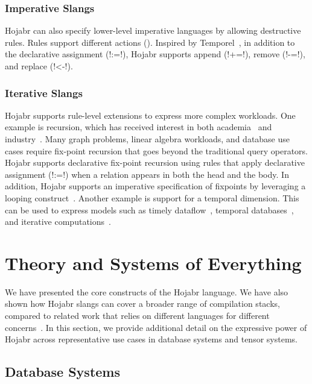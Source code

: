 \documentclass[sigconf,nonacm]{acmart}
\begin{document}
\subsubsection{Imperative Slangs} Hojabr can also specify lower-level imperative languages by allowing destructive rules. Rules support different actions (). Inspired by Temporel~\cite{DBLP:journals/pacmmod/ShaikhhaSSN24}, in addition to the declarative assignment (!:=!), Hojabr supports append (!+=!), remove (!-=!), and replace (!<-!).

\subsubsection{Iterative Slangs} Hojabr supports rule-level extensions to express more complex workloads. One example is recursion, which has received interest in both academia~\cite{shaikhha2026raqlet,10.1145/3299869.3324959,dedalus2011} and industry~\cite{aref2025rel,aref2015design,96b066e5eacd43b299251ec2a7e06a8b}. Many graph problems, linear algebra workloads, and database use cases require fix-point recursion that goes beyond the traditional query operators. Hojabr supports declarative fix-point recursion using rules that apply declarative assignment (!:=!) when a relation appears in both the head and the body. In addition, Hojabr supports an imperative specification of fixpoints by leveraging a looping construct~\cite{DBLP:journals/pacmmod/ShaikhhaSSN24}. Another example is support for a temporal dimension. This can be used to express models such as timely dataflow~\cite{murray2013naiad}, temporal databases~\cite{snodgrass1986temporal}, and iterative computations~\cite{DBLP:journals/pacmmod/ShaikhhaSSN24,murray2016incremental}.

\section{Theory and Systems of Everything}
\label{sec:usecases}
We have presented the core constructs of the Hojabr language. We have also shown how Hojabr slangs can cover a broader range of compilation stacks, compared to related work that relies on different languages for different concerns~\cite{DBLP:conf/sigmod/ShaikhhaKPBD016,jungmair2022designing,shaikhha2018building}. In this section, we provide additional detail on the expressive power of Hojabr across representative use cases in database systems and tensor systems.



\subsection{Database Systems}
\end{document}
